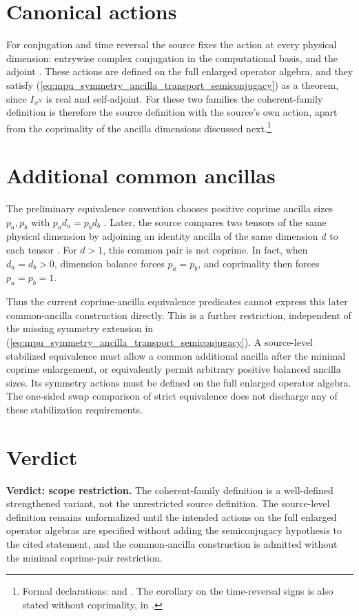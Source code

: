 \documentclass{article}
\begin{document}
\section{Canonical actions}

For conjugation and time reversal the source fixes the action at every
physical dimension: entrywise complex conjugation in the computational basis,
and the adjoint \cite[lines~965--973]{Cirac2017MPU}. These actions are defined
on the full enlarged operator algebra, and they satisfy
(\ref{eq:mpu_symmetry_ancilla_transport_semiconjugacy}) as a theorem, since
$I_{x^N}$ is real and self-adjoint. For these two families the coherent-family
definition is therefore the source definition with the source's own action,
apart from the coprimality of the ancilla dimensions discussed next.\footnote{Formal
    declarations:  and
    . The corollary on the
    time-reversal signs is also stated without coprimality, in
    .}

\section{Additional common ancillas}

The preliminary equivalence convention chooses positive coprime ancilla
sizes $p_a,p_b$ with $p_a d_a=p_b d_b$
\cite[lines~706--724]{Cirac2017MPU}. Later, the source compares two tensors
of the same physical dimension by adjoining an identity ancilla of the same
dimension $d$ to each tensor
\cite[lines~2210--2215]{Cirac2017MPU}. For $d>1$, this common pair is not
coprime. In fact, when $d_a=d_b>0$, dimension balance forces $p_a=p_b$,
and coprimality then forces $p_a=p_b=1$.

Thus the current coprime-ancilla equivalence predicates cannot express this
later common-ancilla construction directly. This is a further restriction,
independent of the missing symmetry extension in
(\ref{eq:mpu_symmetry_ancilla_transport_semiconjugacy}). A source-level
stabilized equivalence must allow a common additional ancilla after the
minimal coprime enlargement, or equivalently permit arbitrary positive
balanced ancilla sizes. Its symmetry actions must be defined on the full
enlarged operator algebra. The one-sided swap comparison of strict
equivalence does not discharge any of these stabilization requirements.

\section{Verdict}

\textbf{Verdict: scope restriction.} The coherent-family definition is a
well-defined strengthened variant, not the unrestricted source definition.
The source-level definition remains unformalized until the intended actions on
the full enlarged operator algebras are specified without adding the
semiconjugacy hypothesis to the cited statement, and the common-ancilla
construction is admitted without the minimal coprime-pair restriction.



\end{document}
